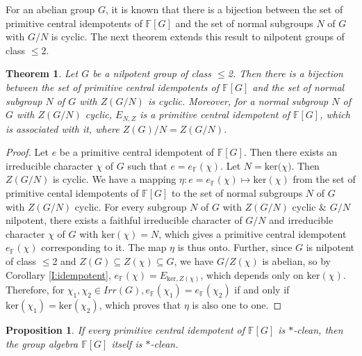 \documentclass[12pt, reqno]{amsart}
\numberwithin{equation}{section}
\theoremstyle{definition}
\theoremstyle{remark}
\theoremstyle{plain}
\newtheorem{theorem}[definition]{Theorem}
\newtheorem{proposition}[definition]{Proposition}
\begin{document}
 For an abelian group $G$, it is known that there is a bijection between the set of primitive central idempotents of $\mathbb{F}[G]$ and the set of normal subgroups $N$ of $G$ with $G/N$ is cyclic. The next theorem extends this result to nilpotent groups of class $\leq$2.
 \begin{theorem}
Let $G$ be a nilpotent group of class $\leq$2. Then there is a bijection between the set of primitive central idempotents of $\mathbb{F}[G]$ and the set of normal subgroup $N$ of $G$ with $Z(G/N)$ is cyclic. Moreover, for a normal subgroup $N$ of $G$ with $Z(G/N)$ cyclic, $E_{N,Z}$ is a primitive central idempotent of $\mathbb{F}[G]$, which is associated with it, where $Z(G)/N=Z(G/N)$.    
 \end{theorem}
 \begin{proof}
Let $e$ be a primitive central idempotent of $\mathbb{F}[G]$. Then there exists an irreducible character $\chi$ of $G$ such that $e = e_{\mathbb{F}}(\chi)$. Let $N =\text{ker($\chi$)}$. Then $Z(G/N)$ is cyclic. We have a mapping $\eta:e=e_{\mathbb{F}}(\chi)\mapsto\text{ker}(\chi)$ from the set of primitive cental idempotents of $\mathbb{F}[G]$ to the set of normal subgroups $N$ of $G$ with $Z(G/N)$ cyclic. For every subgroup $N$ of $G$ with $Z(G/N)$ cyclic $\&$ $G/N$ nilpotent, there exists a faithful irreducible character of $G/N$ and irreducible character $\chi$ of $G$ with $\text{ker}(\chi)=N$, which gives a primitive central idempotent $e_{\mathbb{F}}(\chi)$ corresponding to it. The map $\eta$ is thus onto. Further, since $G$ is nilpotent of class $\leq$2 and $Z(G)\subseteq Z(\chi)\subseteq G$, we have $G/Z(\chi)$ is abelian, so by Corollary \ref{I:idempotent}, $e_{\mathbb{F}}(\chi)=E_{\text{ker},Z(\chi)}$, which depends only on $\text{ker}(\chi)$. Therefore, for $\chi_{1},\chi_{2}\in Irr(G), e_{\mathbb{F}}(\chi_{1})=e_{\mathbb{F}}(\chi_{2})$ if and only if $\text{ker}(\chi_{1})=\text{ker}(\chi_{2})$, which proves that $\eta$ is also one to one.
 \end{proof}
 \begin{proposition}
  If every primitive central idempotent of $\mathbb{F}[G]$ is $*$-clean, then the group algebra $\mathbb{F}[G]$ itself is $*$-clean.
\end{proposition}
\end{document}
